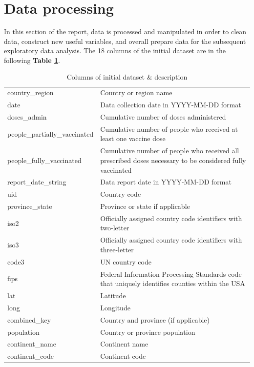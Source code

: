 \section{Data processing}
In this section of the report, data is processed and manipulated in order to clean data, construct new useful variables, and overall prepare data for the subsequent exploratory data analysis.
The 18 columns of the initial dataset are in the following \textbf{Table \ref{tab:columns_table}}.

\begin{table}[h]
\small
\begin{tabular}{l|p{70mm}}
     \hline
     country\_region & Country or region name \\
     date & Data collection date in YYYY-MM-DD format \\ 
     doses\_admin & Cumulative number of doses administered \\
     people\_partially\_vaccinated & Cumulative number of people who received at least one vaccine dose \\
     people\_fully\_vaccinated & Cumulative number of people who received all prescribed doses necessary to be considered fully vaccinated \\
     report\_date\_string & Data report date in YYYY-MM-DD format \\
     uid & Country code \\
     province\_state & Province or state if applicable \\
     iso2 & Officially assigned country code identifiers with two-letter \\
     iso3 & Officially assigned country code identifiers with three-letter \\
     code3 & UN country code \\
     fips & Federal Information Processing Standards code that uniquely identifies counties within the
     USA \\
     lat & Latitude \\
     long & Longitude \\
     combined\_key & Country and province (if applicable) \\
     population & Country or province population \\
     continent\_name & Continent name \\
     continent\_code & Continent code \\
     \hline
\end{tabular}
\caption{\label{tab:columns_table}Columns of initial dataset \& description}
\end{table}

